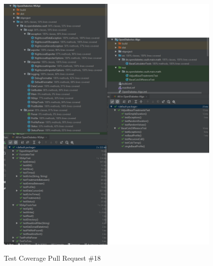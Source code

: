 \documentclass[accentcolor=tud0b,12pt,paper=a4]{tudreport}
\begin{document}
\begin{figure}[h]
\centering
\caption{Test Coverage Pull Request \#18}
\includegraphics[width=\textwidth,height=\textheight,keepaspectratio]{pr-cov-18}
\label{pr-cov:18}
\end{figure}
\end{document}
